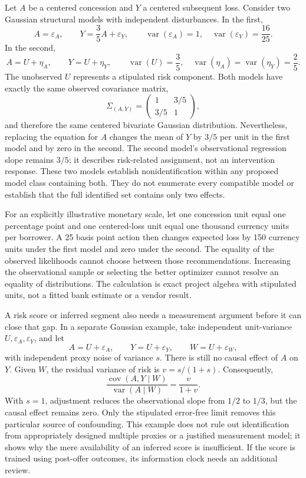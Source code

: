 Let \(A\) be a centered concession and \(Y\) a centered subsequent loss.
Consider two Gaussian structural models with independent disturbances.
In the first, \[
 A=\varepsilon_A,\qquad
 Y=\frac35 A+\varepsilon_Y,\qquad
 \operatorname{var}(\varepsilon_A)=1,\quad
 \operatorname{var}(\varepsilon_Y)=\frac{16}{25}.
\] In the second, \[
 A=U+\eta_A,\qquad Y=U+\eta_Y,\qquad
 \operatorname{var}(U)=\frac35,\quad
 \operatorname{var}(\eta_A)=\operatorname{var}(\eta_Y)=\frac25.
\] The unobserved \(U\) represents a stipulated risk component. Both
models have exactly the same observed covariance matrix, \[
 \Sigma_{(A,Y)}=
 \begin{pmatrix}1&3/5\\3/5&1\end{pmatrix},
\] and therefore the same centered bivariate Gaussian distribution.
Nevertheless, replacing the equation for \(A\) changes the mean of \(Y\)
by \(3/5\) per unit in the first model and by zero in the second. The
second model's observational regression slope remains \(3/5\); it
describes risk-related assignment, not an intervention response. These
two models establish nonidentification within any proposed model class
containing both. They do not enumerate every compatible model or
establish that the full identified set contains only two effects.
\citep{exec13_latent_examples}

For an explicitly illustrative monetary scale, let one concession unit
equal one percentage point and one centered-loss unit equal one thousand
currency units per borrower. A 25 basis point action then changes
expected loss by 150 currency units under the first model and zero under
the second. The equality of the observed likelihoods cannot choose
between those recommendations. Increasing the observational sample or
selecting the better optimizer cannot resolve an equality of
distributions. The calculation is exact project algebra with stipulated
units, not a fitted bank estimate or a vendor result.
\citep{exec13_latent_examples}

A risk score or inferred segment also needs a measurement argument
before it can close that gap. In a separate Gaussian example, take
independent unit-variance \(U,\varepsilon_A,\varepsilon_Y\), and let \[
 A=U+\varepsilon_A,\qquad Y=U+\varepsilon_Y,\qquad
 W=U+\varepsilon_W,
\] with independent proxy noise of variance \(s\). There is still no
causal effect of \(A\) on \(Y\). Given \(W\), the residual variance of
risk is \(v=s/(1+s)\). Consequently, \[
 \frac{\operatorname{cov}(A,Y\mid W)}
      {\operatorname{var}(A\mid W)}=
 \frac{v}{1+v}.
\] With \(s=1\), adjustment reduces the observational slope from \(1/2\)
to \(1/3\), but the causal effect remains zero. Only the stipulated
error-free limit removes this particular source of confounding. This
example does not rule out identification from appropriately designed
multiple proxies or a justified measurement model; it shows why the mere
availability of an inferred score is insufficient. If the score is
trained using post-offer outcomes, its information clock needs an
additional review. \citep{exec13_latent_examples}

